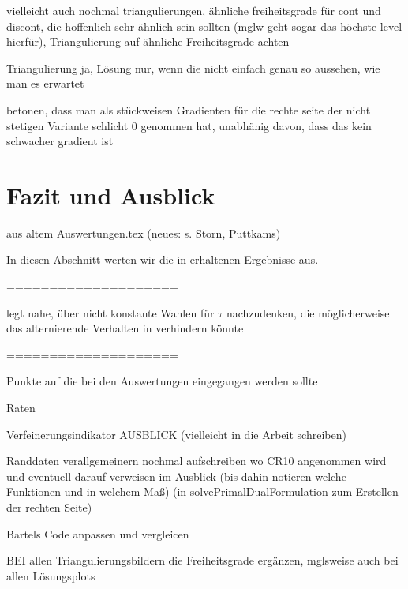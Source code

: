 vielleicht auch nochmal triangulierungen, ähnliche freiheitsgrade für cont 
und discont, die hoffenlich sehr ähnlich sein sollten (mglw geht sogar das 
höchste level hierfür), Triangulierung auf ähnliche Freiheitsgrade achten

Triangulierung ja, Lösung nur, wenn die nicht einfach genau so aussehen, wie
man es erwartet

betonen, dass man als stückweisen Gradienten für die rechte seite der nicht 
stetigen Variante schlicht 0 genommen hat, unabhänig davon, dass das
kein schwacher gradient ist


\section{Fazit und Ausblick}

aus altem Auswertungen.tex (neues: s. Storn, Puttkams)

In diesen Abschnitt werten wir die in  erhaltenen
Ergebnisse aus.


====================

 legt nahe, über nicht konstante Wahlen für
$\tau$ nachzu\-denken, die mög\-lich\-er\-wei\-se das alternierende Verhalten in
 verhindern könnte

====================

Punkte auf die bei den Auswertungen eingegangen werden sollte

Raten

Verfeinerungsindikator
AUSBLICK (vielleicht in die Arbeit schreiben)
  
  Randdaten verallgemeinern
    nochmal aufschreiben wo CR10 angenommen wird und eventuell darauf verweisen 
    im Ausblick (bis dahin notieren welche Funktionen und in welchem Maß)
    (in solvePrimalDualFormulation zum Erstellen der rechten Seite)
    
  Bartels Code anpassen und vergleicen

BEI allen Triangulierungsbildern die Freiheitsgrade ergänzen, mglsweise auch
bei allen Lösungsplots
